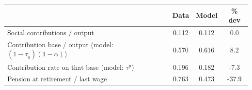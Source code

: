 \begin{tabular}{@{}lS[table-format=1.3]S[table-format=1.3]S[table-format=+3.1]@{}}
\toprule
 & {Data} & {Model} & {\% dev} \\
\midrule
Social contributions / output & 0.112 & 0.112 & 0.0 \\
Contribution base / output (model: $(1-\tau_y)(1-\alpha)$) & 0.570 & 0.616 & 8.2 \\
Contribution rate on that base (model: $\tau^p$) & 0.196 & 0.182 & -7.3 \\
Pension at retirement / last wage & 0.763 & 0.473 & -37.9 \\
\bottomrule
\end{tabular}
